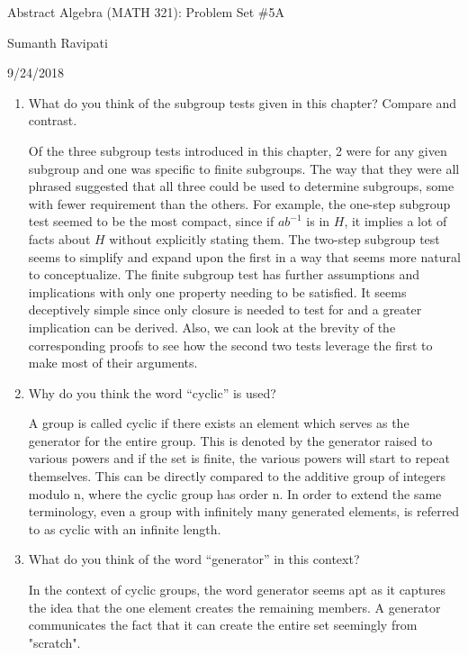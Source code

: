 \documentclass{article}
\begin{document}
%
\centerline{\Large Abstract Algebra (MATH 321): Problem Set \#5A}
\centerline{Sumanth Ravipati}
\centerline{9/24/2018}
\vspace{.25in}

\begin{enumerate}
    \item What do you think of the subgroup tests given in this chapter? Compare and contrast.
    \begin{flushleft}
    Of the three subgroup tests introduced in this chapter, 2 were for any given subgroup and one was specific to finite subgroups. The way that they were all phrased suggested that all three could be used to determine subgroups, some with fewer requirement than the others. For example, the one-step subgroup test seemed to be the most compact, since if $ab^{-1}$ is in $H$, it implies a lot of facts about $H$ without explicitly stating them. The two-step subgroup test seems to simplify and expand upon the first in a way that seems more natural to conceptualize. The finite subgroup test has further assumptions and implications with only one property needing to be satisfied. It seems deceptively simple since only closure is needed to test for and a greater implication can be derived. Also, we can look at the brevity of the corresponding proofs to see how the second two tests leverage the first to make most of their arguments.
    \end{flushleft}
    \item Why do you think the word “cyclic” is used?
    \begin{flushleft}
        A group is called cyclic if there exists an element which serves as the generator for the entire group. This is denoted by the generator raised to various powers and if the set is finite, the various powers will start to repeat themselves. This can be directly compared to the additive group of integers modulo n, where the cyclic group has order n. In order to extend the same terminology, even a group with infinitely many generated elements, is referred to as cyclic with an infinite length.
    \end{flushleft}
    \item What do you think of the word “generator” in this context?
    \begin{flushleft}
    In the context of cyclic groups, the word generator seems apt as it captures the idea that the one element creates the remaining members. A generator communicates the fact that it can create the entire set seemingly from "scratch".
    \end{flushleft}

\end{enumerate}
\end{document}
